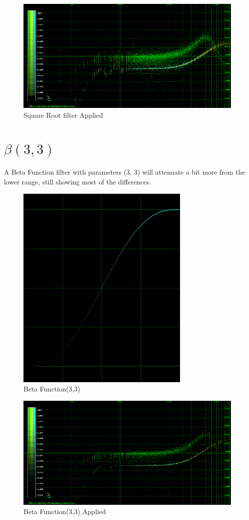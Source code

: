 \documentclass[10pt,a4paper]{report}
\begin{document}
\begin{appendices}
\begin{figure}[H]
	\centering
	\includegraphics[width=1\linewidth]{images/colorfilter/BetaFunctionPlot_1_Data.png}
	\caption[Square Root filter]{Square Root filter Applied}
	\label{fig:betafunctionplot1data}
\end{figure}

\newpage
\section{$\beta(3,3)$}

A Beta Function filter with parameters (3, 3) will attenuate a bit more from the lower range, still showing most of the differences.

\begin{figure}[H]
	\centering
	\includegraphics[width=0.4\linewidth]{images/colorfilter/BetaFunctionPlot_2.png}
	\caption[Beta Function(3,3)]{Beta Function(3,3)}
	\label{fig:betafunctionplot2}
\end{figure}

\begin{figure}[H]
	\centering
	\includegraphics[width=1\linewidth]{images/colorfilter/BetaFunctionPlot_2_Data.png}
	\caption[Beta Function(3,3)]{Beta Function(3,3) Applied}
	\label{fig:betafunctionplot2data}
\end{figure}


\end{appendices}
\end{document}
